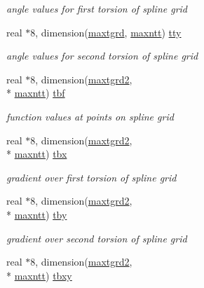 \begin{DoxyCompactItemize}
\begin{DoxyCompactList}\small\item\em angle values for first torsion of spline grid \end{DoxyCompactList}\item 
real $\ast$8, dimension(\hyperlink{classktrtor_a5c2d655cdc848a5d23532dc079e23cc5}{maxtgrd}, \hyperlink{classktrtor_a3ec5934a4d1ffdfbc4f1bfbc33b1b836}{maxntt}) \hyperlink{classktrtor_aed5da189159d6c5dbba622a8e859e839}{tty}
\begin{DoxyCompactList}\small\item\em angle values for second torsion of spline grid \end{DoxyCompactList}\item 
real $\ast$8, dimension(\hyperlink{classktrtor_a83f65d5a672e0c8e0cf9db285915243b}{maxtgrd2}, \\*
\hyperlink{classktrtor_a3ec5934a4d1ffdfbc4f1bfbc33b1b836}{maxntt}) \hyperlink{classktrtor_a3e7fd2e1979b5b7e0f05fdddb5429b03}{tbf}
\begin{DoxyCompactList}\small\item\em function values at points on spline grid \end{DoxyCompactList}\item 
real $\ast$8, dimension(\hyperlink{classktrtor_a83f65d5a672e0c8e0cf9db285915243b}{maxtgrd2}, \\*
\hyperlink{classktrtor_a3ec5934a4d1ffdfbc4f1bfbc33b1b836}{maxntt}) \hyperlink{classktrtor_ad90617cead2c03c1b215f81cd359e88d}{tbx}
\begin{DoxyCompactList}\small\item\em gradient over first torsion of spline grid \end{DoxyCompactList}\item 
real $\ast$8, dimension(\hyperlink{classktrtor_a83f65d5a672e0c8e0cf9db285915243b}{maxtgrd2}, \\*
\hyperlink{classktrtor_a3ec5934a4d1ffdfbc4f1bfbc33b1b836}{maxntt}) \hyperlink{classktrtor_afb5202fc5a804c1a2fc32e0c6b6f1dec}{tby}
\begin{DoxyCompactList}\small\item\em gradient over second torsion of spline grid \end{DoxyCompactList}\item 
real $\ast$8, dimension(\hyperlink{classktrtor_a83f65d5a672e0c8e0cf9db285915243b}{maxtgrd2}, \\*
\hyperlink{classktrtor_a3ec5934a4d1ffdfbc4f1bfbc33b1b836}{maxntt}) \hyperlink{classktrtor_a766d3639dce77480684252b6be8f5b7c}{tbxy}

\end{DoxyCompactItemize}
